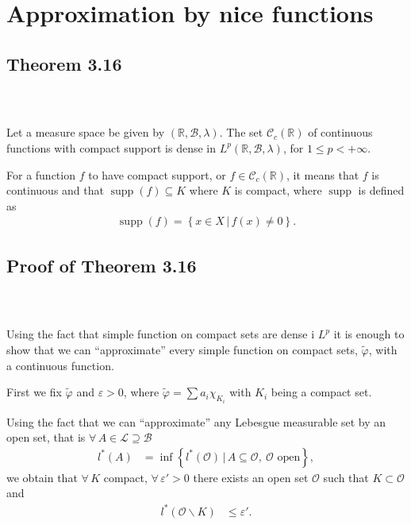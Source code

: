\documentclass{beamer}
\numberwithin{equation}{section}
\DeclareMathOperator{\supp}{supp}
\begin{document}
\section{Approximation by nice functions}

\subsection{Theorem 3.16}

\begin{frame}\frametitle{{\normalsize \secname} \\ {\large \subsecname}}
    \begin{theorem}[3.16]
    Let a measure space be given by $(\mathbb{R}, \mathcal{B}, \lambda)$.
    The set $\mathcal{C}_c(\mathbb{R})$ of continuous functions with compact support is dense in $L^p(\mathbb{R}, \mathcal{B}, \lambda)$, for $1\leq p < + \infty$.
    \end{theorem}
    \vspace{1em}

    \begingroup
    \small
    For a function $f$ to have compact support, or $f \in \mathcal{C}_c(\mathbb{R})$, it means that $f$ is continuous and that $\supp(f) \subseteq K$ where $K$ is compact, where $\supp$ is defined as
    \begin{align}
        \supp(f) = \left\{x \in X \, | \, f(x) \neq 0 \right\}.
    \end{align}
    \endgroup
\end{frame}

\subsection{Proof of Theorem 3.16}

\begin{frame}\frametitle{{\normalsize \secname} \\ {\large \subsecname}}
    Using the fact that simple function on compact sets are dense i $L^p$ it is enough to show that we can ``approximate'' every simple function on compact sets, $\tilde{\varphi}$, with a continuous function.
    \vspace{1em}

    First we fix $\tilde{\varphi}$ and $\varepsilon > 0$, where $\tilde{\varphi} = \sum a_i \chi_{K_i}$ with $K_i$ being a compact set.
    \vspace{1em}

    Using the fact that we can ``approximate'' any Lebesgue measurable set by an open set, that is $\forall \, A \in \mathcal{L} \supseteq \mathcal B$
    \begin{align}
        l^*(A) &= \inf \left\{l^*(\mathcal{O}) \, | \, A \subseteq \mathcal{O}, \ \mathcal{O} \text{ open}\right\},
    \end{align}
    we obtain that $\forall \, K$ compact, $\forall \, \varepsilon' > 0$ there exists an open set $\mathcal{O}$ such that $K \subset \mathcal{O}$ and
    \begin{align}
        l^*(\mathcal{O}\backslash K) &\leq \varepsilon'.
    \end{align}
\end{frame}
\end{document}
